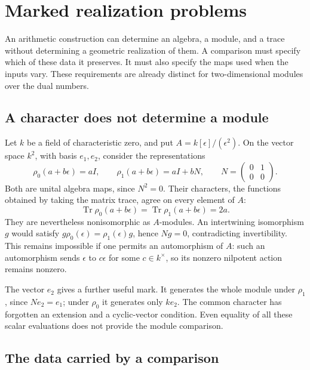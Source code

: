 \chapter{Marked realization problems}
\label{v4-ch:marked-realizations}

An arithmetic construction can determine an algebra, a module, and a
trace without determining a geometric realization of them. A comparison
must specify which of these data it preserves. It must also specify the
maps used when the inputs vary. These requirements are already distinct
for two-dimensional modules over the dual numbers.

\section{A character does not determine a module}
\label{v4-marked:sec:characters}

Let \(k\) be a field of characteristic zero, and put
\(A=k[\epsilon]/(\epsilon^2)\). On the vector space \(k^2\),
with basis \(e_1,e_2\), consider the representations
\[
 \rho_0(a+b\epsilon)=aI,
 \qquad
 \rho_1(a+b\epsilon)=aI+bN,
 \qquad
 N=\begin{pmatrix}0&1\\0&0\end{pmatrix}.
\]
Both are unital algebra maps, since \(N^2=0\). Their characters,
the functions obtained by taking the matrix trace, agree on every
element of \(A\):
\begin{equation}\label{v4-marked:eq:characters}
 \operatorname{Tr}\rho_0(a+b\epsilon)
 =\operatorname{Tr}\rho_1(a+b\epsilon)=2a.
\end{equation}
They are nevertheless nonisomorphic as \(A\)-modules. An
intertwining isomorphism \(g\) would satisfy \(g\rho_0(\epsilon)
=\rho_1(\epsilon)g\), hence \(Ng=0\), contradicting
invertibility. This remains impossible if one permits an automorphism
of \(A\): such an automorphism sends \(\epsilon\) to
\(c\epsilon\) for some \(c\in k^\times\), so its nonzero
nilpotent action remains nonzero.

The vector \(e_2\) gives a further useful mark. It generates the
whole module under \(\rho_1\), since \(Ne_2=e_1\); under
\(\rho_0\) it generates only \(ke_2\). The common character has
forgotten an extension and a cyclic-vector condition. Even equality of
all these scalar evaluations does not provide the module comparison.

\section{The data carried by a comparison}
\label{v4-marked:sec:data}

